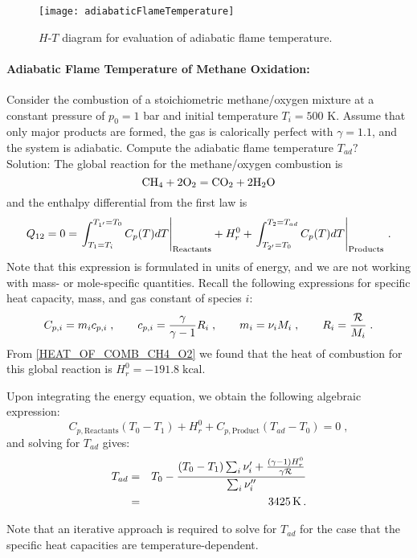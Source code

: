 \begin{figure}[!h!]
\begin{center}
  \texttt{[image: adiabaticFlameTemperature]}
  \caption{\label{FIG_ADIABATIC_FLAME_TEMPERATURE}$H$-$T$ diagram for evaluation of adiabatic flame temperature.}
\end{center}
\end{figure}

\paragraph*{Adiabatic Flame Temperature of Methane Oxidation:} Consider the combustion of a stoichiometric methane/oxygen mixture at a constant pressure of $p_0=1$ bar and initial temperature $T_i=500$ K. Assume that only major products are formed, the gas is calorically perfect with $\gamma=1.1$, and the system is adiabatic. Compute the adiabatic flame temperature $T_{ad}?$
\\
Solution: The global reaction for the methane/oxygen combustion is 
\[
 \mathrm{CH_4+2O_2}=\mathrm{CO_2 + 2 H_2O}
\]
and the enthalpy differential from the first law is
\[
 Q_{12} = 0 = \left.\int^{T_{1'}=T_0}_{T_1=T_i} C_p(T) d T\right|_{\rm{Reactants}} + H^0_r + 
              \left.\int^{T_2=T_{ad}}_{T_{2'}=T_0} C_p(T) d T\right|_{\rm{Products}} \, \text{.}
\]
Note that this expression is formulated in units of energy, and we are not working with mass- or mole-specific quantities. 
Recall the following expressions for specific heat capacity, mass, and gas constant of species $i$:
\[
 C_{p,i} = m_i c_{p,i}\;,\qquad c_{p,i} = {\frac{\gamma}{\gamma-1}}R_i\;,\qquad m_i = \nu_iM_i\;,\qquad R_i = {\frac{{\cal{R}}}{M_i}}\;.
\]
From \cref{HEAT_OF_COMB_CH4_O2} we found that the heat of combustion for this global reaction is $H^0_r = -191.8\;\text{kcal}$.

Upon integrating the energy equation, we obtain the following algebraic expression:
\[
 C_{p,\text{Reactants}}(T_0-T_1) +  H^0_r + C_{p,\text{Product}}(T_{ad}-T_0) = 0\;,
\]
and solving for $T_{ad}$ gives:
\begin{eqnarray*}
 T_{ad} &=& T_0 - {\frac{(T_0-T_1)\sum_i\nu'_i + {\frac{(\gamma-1) H^0_r}{\gamma {\cal{R}}}}}{\sum_i\nu''_i}}\\
        &=& 3425\,\text{K} \, \text{.}
\end{eqnarray*}

Note that an iterative approach is required to solve for $T_{ad}$ for the case that the specific heat capacities are temperature-dependent.

